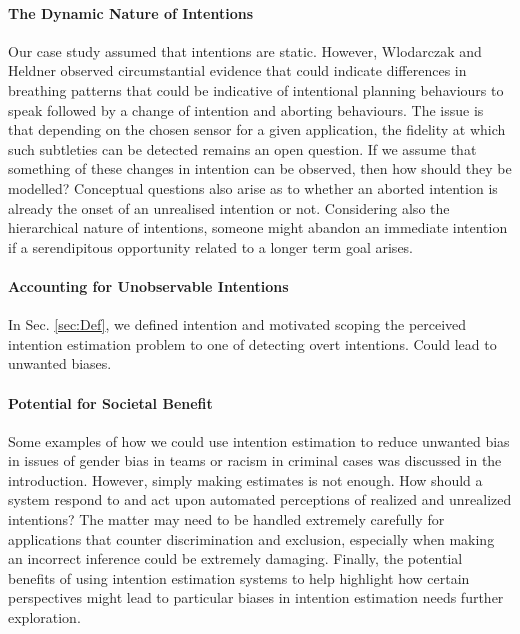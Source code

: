 \documentclass[sigconf]{acmart}
\begin{document}

\paragraph{The Dynamic Nature of Intentions}
Our case study assumed that intentions are static. However, Wlodarczak and Heldner \cite{Wlodarczak2020} observed circumstantial evidence that could indicate differences in breathing patterns that could be indicative of intentional planning behaviours to speak followed by a change of intention and aborting behaviours. The issue is that depending on the chosen sensor for a given application, the fidelity at which such subtleties can be detected remains an open question. If we assume that something of these changes in intention can be observed, then how should they be modelled? Conceptual questions also arise as to whether an aborted intention is already the onset of an unrealised intention or not. Considering also the hierarchical nature of intentions, someone might abandon an immediate intention if a serendipitous opportunity related to a longer term goal arises.

\paragraph{Accounting for Unobservable Intentions}
In Sec. \ref{sec:Def}, we defined intention and motivated scoping the perceived intention estimation problem to one of detecting overt intentions. Could lead to unwanted biases.

\paragraph {Potential for Societal Benefit} 
Some examples of how we could use intention estimation to reduce unwanted bias in issues of gender bias in teams or racism in criminal cases was discussed in the introduction. However, simply making estimates is not enough. How should a system respond to and act upon automated perceptions of realized and unrealized intentions? The matter may need to be handled extremely carefully for applications that counter discrimination and exclusion, especially when making an incorrect inference could be extremely damaging. Finally, the potential benefits of using intention estimation systems to help highlight how certain perspectives might lead to particular biases in intention estimation needs further exploration.
\balance
\end{document}
